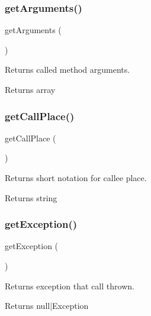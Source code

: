 \subsubsection{\texorpdfstring{get\+Arguments()}{getArguments()}}
{\footnotesize\ttfamily get\+Arguments (\begin{DoxyParamCaption}{ }\end{DoxyParamCaption})}

Returns called method arguments.

\begin{DoxyReturn}{Returns}
array 
\end{DoxyReturn}
\mbox{\label{class_prophecy_1_1_call_1_1_call_a969d1eb362c15f660c2f0f75ed3d265b}} 
\subsubsection{\texorpdfstring{get\+Call\+Place()}{getCallPlace()}}
{\footnotesize\ttfamily get\+Call\+Place (\begin{DoxyParamCaption}{ }\end{DoxyParamCaption})}

Returns short notation for callee place.

\begin{DoxyReturn}{Returns}
string 
\end{DoxyReturn}
\mbox{\label{class_prophecy_1_1_call_1_1_call_a31ec439e56ccf74108b96587373a112c}} 
\subsubsection{\texorpdfstring{get\+Exception()}{getException()}}
{\footnotesize\ttfamily get\+Exception (\begin{DoxyParamCaption}{ }\end{DoxyParamCaption})}

Returns exception that call thrown.

\begin{DoxyReturn}{Returns}
null$\vert$\+Exception 
\end{DoxyReturn}
\mbox{\label{class_prophecy_1_1_call_1_1_call_adf61e733be7f62a3f4bedbe7d2e02ec2}} 
